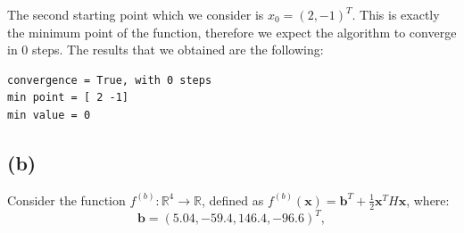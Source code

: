 \documentclass[a4paper,11pt]{article}
\begin{document}
	\noindent The second starting point which we consider is $x_{0}=(2,-1)^{T}$. This is exactly the minimum point of the function, therefore we expect the algorithm to converge in $0$ steps. The results that we obtained are the following:
	
\begin{verbatim}
convergence = True, with 0 steps
min point = [ 2 -1]
min value = 0 
\end{verbatim}

	\subsection{(b)}
	Consider the function $f^{(b)}:\mathbb{R}^{4} \rightarrow  \mathbb{R}$, defined as $f^{(b)}(\textbf{x}) = \textbf{b}^{T} + \frac{1}{2}\textbf{x}^{T}H\textbf{x}$, where:
	\begin{equation}
		\textbf{b} = (5.04, -59.4, 146.4, -96.6)^{T},
	\end{equation}
\end{document}
